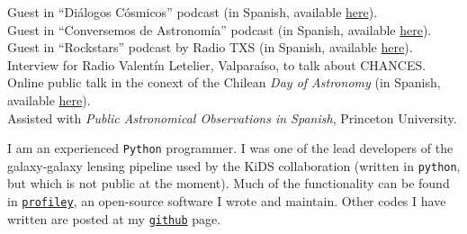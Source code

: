 \documentclass[11pt]{article}
\begin{document}
\noindent
{} Guest in ``Di\'alogos C\'osmicos'' podcast (in Spanish, available \href{https://www.youtube.com/watch?v=6hFChKVBkH8&pp=ygURZGlhbG9nb3MgY29zbWljb3M%3D}{here}).\\
 Guest in ``Conversemos de Astronomía'' podcast (in Spanish, available \href{https://open.spotify.com/episode/4PBTlnI3ufDtBwXIGee5mp?si=KGS43HFnSuiVdVPYaoBMqA}{here}).\\
 Guest in ``Rockstars'' podcast by Radio TXS (in Spanish, available \href{https://soundcloud.com/txsplus/rockstars-con-gabriel-leon-y-cristobal-sifon-4-de-noviembre-del-2022?utm_source=Email&utm_campaign=social_sharing&utm_medium=widgetutm_content=https%3A%2F%2Fsoundcloud.com%2Ftxsplus%2Frockstars-con-gabriel-leon-y-cristobal-sifon-4-de-noviembre-del-2022}{here}).\\
 Interview for Radio Valent\'in Letelier, Valparaíso, to talk about CHANCES.\\
 Online public talk in the conext of the Chilean \textit{Day of Astronomy} (in Spanish, available \href{https://www.youtube.com/watch?v=MgrKSd6JWkE}{here}).\\
 Assisted with \emph{Public Astronomical Observations in Spanish}, Princeton University.\\



\hline
\pagebreak



\noindent
I am an experienced \texttt{Python} programmer. 
I was one of the lead developers of the galaxy-galaxy lensing pipeline used by the 
KiDS collaboration (written in \texttt{python}, but which is not public at the 
moment). Much of the functionality can be found in \href{https://profiley.readthedocs.io/en/latest/index.html}{\texttt{profiley}}, an open-source software I wrote and maintain. Other codes I have written are posted at my \href{https://github.com/cristobal-sifon}{\texttt{github}} page.\\
\end{document}

